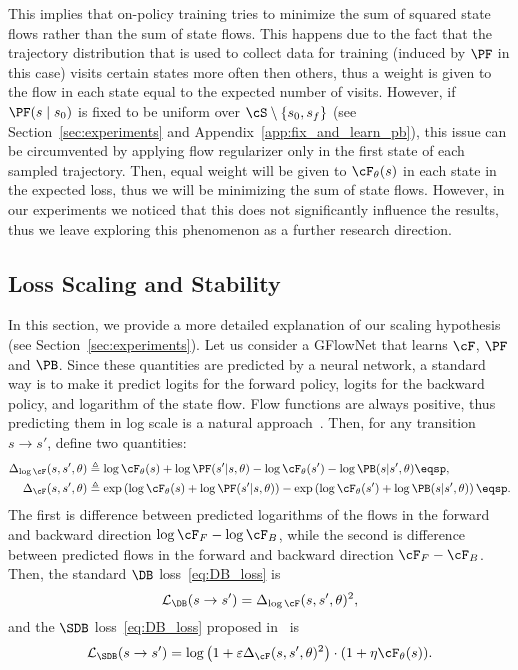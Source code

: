 This implies that on-policy training tries to minimize the sum of squared state flows rather than the sum of state flows. This happens due to the fact that the trajectory distribution that is used to collect data for training (induced by $\PF$ in this case) visits certain states more often then others, thus a weight is given to the flow in each state equal to the expected number of visits. However, if $\PF(s \mid s_0)$ is fixed to be uniform over $\cS \setminus \{s_0, s_f\}$ (see Section~\ref{sec:experiments} and Appendix~\ref{app:fix_and_learn_pb}), this issue can be circumvented by applying flow regularizer only in the first state of each sampled trajectory. Then, equal weight will be given to $\cF_\theta(s)$ in each state in the expected loss, thus we will be minimizing the sum of state flows. However, in our experiments we noticed that this does not significantly influence the results, thus we leave exploring this phenomenon as a further research direction.

\subsection{Loss Scaling and Stability}\label{app:scaling_stability}

In this section, we provide a more detailed explanation of our scaling hypothesis (see Section~\ref{sec:experiments}). Let us consider a GFlowNet that learns $\cF$, $\PF$ and $\PB$. Since these quantities are predicted by a neural network, a standard way is to make it predict logits for the forward policy, logits for the backward policy, and logarithm of the state flow. Flow functions are always positive, thus predicting them in log scale is a natural approach~\cite{bengio2021flow, bengio2023gflownet}. Then, for any transition $s \to s'$, define two quantities:
\begin{equation}%
\begin{split}
\Delta_{\log \cF}(s,s',\theta) &\triangleq \log\cF_{\theta}(s) + \log\PF(s' | s, \theta) 
 - \log \cF_{\theta}(s') - \log\PB(s | s', \theta)\eqsp, \\\
\Delta_{\cF}(s,s',\theta) &\triangleq \exp\left(\log\cF_{\theta}(s) + \log\PF(s' | s, \theta)\right) 
 - \exp\left(\log \cF_{\theta}(s') + \log\PB(s | s', \theta)\right)\eqsp.
\end{split}
\end{equation}
The first is difference between predicted logarithms of the flows in the forward and backward direction $\log \cF_F - \log \cF_B$, while the second is difference between predicted flows in the forward and backward direction $ \cF_F - \cF_B$.
Then, the standard $\DB$ loss~\eqref{eq:DB_loss} is
$$
\mathcal{L}_{\DB}(s \to s') =  \Delta_{\log \cF}(s,s',\theta)^2, 
$$
and the $\SDB$ loss~\eqref{eq:DB_loss} proposed in~\cite{brunswic2024theory} is
$$
\mathcal{L}_{\SDB}(s \to s') =  \log\left(1 + \varepsilon \Delta_{\cF}(s,s', \theta)^2\right) \cdot (1 + \eta \cF_\theta(s)).
$$


